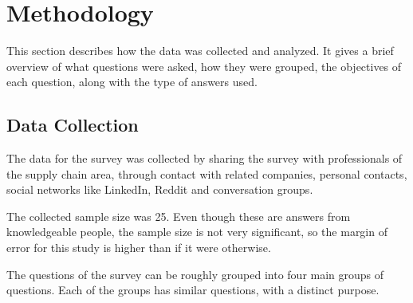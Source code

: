 \section{Methodology}
This section describes how the data was collected and analyzed. It gives a brief overview of what questions were asked, how they were grouped, the objectives of each question, along with the type of answers used.


\subsection{Data Collection}
The data for the survey was collected by sharing the survey with professionals of the supply chain area, through contact with related companies, personal contacts, social networks like LinkedIn, Reddit and conversation groups. 

The collected sample size was 25. Even though these are answers from knowledgeable people, the sample size is not very significant, so the margin of error for this study is higher than if it were otherwise. 


The questions of the survey can be roughly grouped into four main groups of questions. Each of the groups has similar questions, with a distinct purpose.
  
